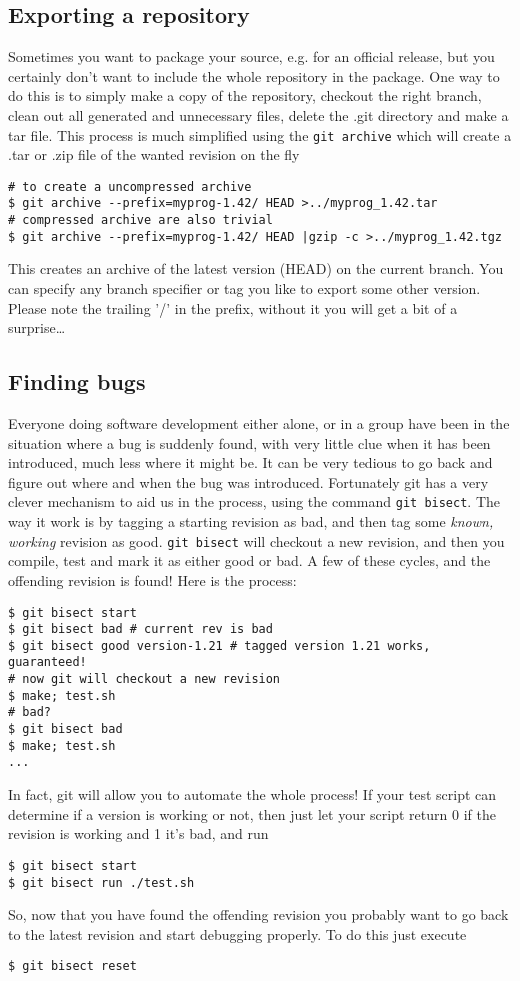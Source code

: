 \documentclass[a4paper,10pt]{article}
\begin{document}
\subsection{Exporting a repository}
Sometimes you want to package your source, e.g. for an official release, but
you certainly don't want to include the whole repository in the package. One
way to do this is to simply make a copy of the repository, checkout the right
branch, clean out all
generated and unnecessary files, delete the .git directory and make a tar
file. This process is much simplified using the \texttt{git archive} which
will create a .tar or .zip file of the wanted revision on the fly
\begin{verbatim}
# to create a uncompressed archive
$ git archive --prefix=myprog-1.42/ HEAD >../myprog_1.42.tar
# compressed archive are also trivial
$ git archive --prefix=myprog-1.42/ HEAD |gzip -c >../myprog_1.42.tgz
\end{verbatim}
This creates an archive of the latest version (HEAD) on the current branch.
You can specify any branch specifier or tag you like to export some other
version.
Please note the trailing '/' in the prefix, without it you will get a bit of a
surprise\ldots

\subsection{Finding bugs}
Everyone doing software development either alone, or in a group have been in
the situation where a bug is suddenly found, with very little clue when
it has been introduced, much less where it might be. It can be very tedious to
go back and figure out where and when the bug was introduced. Fortunately git
has a very clever mechanism to aid us in the process, using the command
\texttt{git bisect}. The way it work is by tagging a starting revision as bad,
and then tag some \textit{known, working} revision as good.  \texttt{git
bisect} will checkout a new revision, and then you compile, test and mark it
as either good or bad. A few of these cycles, and the offending revision is
found! Here is the process:

\begin{verbatim}
$ git bisect start 
$ git bisect bad # current rev is bad
$ git bisect good version-1.21 # tagged version 1.21 works, guaranteed!
# now git will checkout a new revision 
$ make; test.sh 
# bad?
$ git bisect bad
$ make; test.sh
...
\end{verbatim}
In fact, git will allow you to automate the whole process! If your test script
can determine if a version is working or not, then just let your script return
0 if the revision is working and 1 it's bad, and run
\begin{verbatim}
$ git bisect start 
$ git bisect run ./test.sh
\end{verbatim}
So, now that you have found the offending revision you probably want to go 
back to the latest revision and start debugging properly. To do this just
execute
\begin{verbatim}
$ git bisect reset
\end{verbatim}
\end{document}

